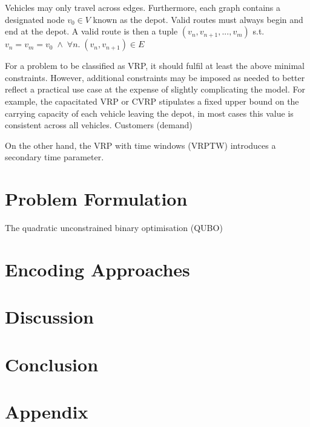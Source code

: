 \documentclass {article}
\begin{document}
Vehicles may only travel across edges. Furthermore, each graph contains a
designated node $v_0 \in V$ known as the depot. Valid routes must always
begin and end at the depot. A valid route is then a tuple
$(v_n, v_{n+1}, ..., v_m)$ s.t.
$v_n = v_m = v_0 \; \land \; \forall n. \; (v_n, v_{n+1}) \in E$

For a problem to be classified as VRP, it should fulfil at least the above
minimal constraints. However, additional constraints may be imposed as
needed to better reflect a practical use case at the expense of slightly
complicating the model. For example, the capacitated VRP or CVRP stipulates
a fixed upper bound on the carrying capacity of each vehicle leaving the
depot, in most cases this value is consistent across all vehicles. Customers
(demand)

On the other hand, the VRP with time windows (VRPTW) introduces a secondary
time parameter.

\section {Problem Formulation}
The quadratic unconstrained binary optimisation (QUBO) 

\section {Encoding Approaches}

\section {Discussion}

\section {Conclusion}

\section {Appendix}
\end{document}
